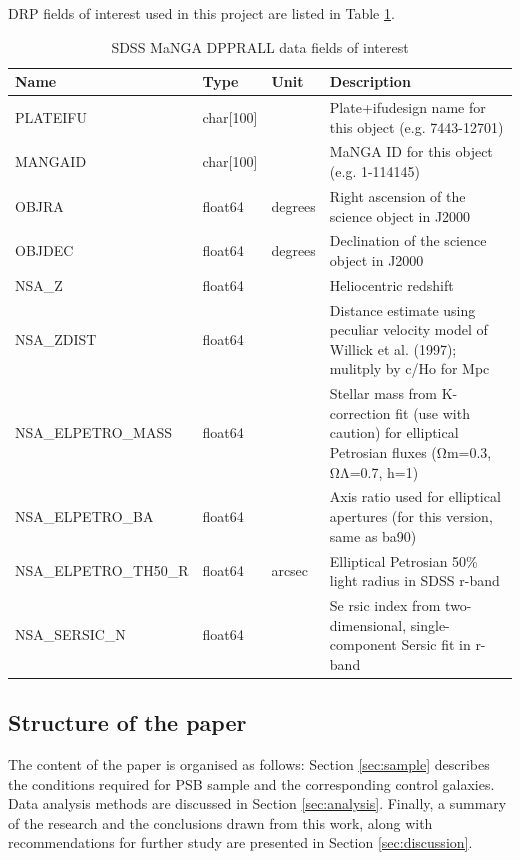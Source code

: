 DRP fields of interest used in this project are listed in Table \ref{tab:DRPall-table}.

\begin{table}
\caption[MaNGA DRPALL fields]{SDSS MaNGA DPPRALL data fields of interest}
\label{tab:DRPall-table}
\begin{tabular}{|p{3.2cm}|p{1.2cm}||p{1cm}|p{10cm}|}
\hline
Name & Type & Unit & Description \\
\hline
PLATEIFU & char{[}100{]} &  & Plate+ifudesign name for this object (e.g. 7443-12701)\\
MANGAID & char{[}100{]} & & MaNGA ID for this object (e.g. 1-114145)\\
OBJRA & float64 & degrees & Right ascension of the science object in J2000\\
OBJDEC & float64 & degrees & Declination of the science object in J2000\\
NSA\_Z & float64 &  & Heliocentric redshift\\
NSA\_ZDIST & float64 &  & Distance estimate using peculiar velocity model of Willick et al. (1997); mulitply by c/Ho for Mpc\\
NSA\_ELPETRO\_MASS & float64 &  & Stellar mass from K-correction fit (use with caution) for elliptical Petrosian fluxes (Ωm=0.3, ΩΛ=0.7, h=1)\\
NSA\_ELPETRO\_BA & float64 &  & Axis ratio used for elliptical apertures (for this version, same as ba90)\\
NSA\_ELPETRO\_TH50\_R & float64 & arcsec & Elliptical Petrosian 50\% light radius in SDSS r-band\\
NSA\_SERSIC\_N & float64 &  & Se
rsic index from two-dimensional, single-component Sersic fit in r-band\\
\hline
\end{tabular}
\end{table}

\subsection{Structure of the paper}
The content of the paper is organised as follows: Section \ref{sec:sample} describes the conditions required for PSB sample and the corresponding control galaxies. Data analysis methods are discussed in Section \ref{sec:analysis}. Finally, a summary of the research and the conclusions drawn from this work, along with recommendations for further study are presented in Section \ref{sec:discussion}.
